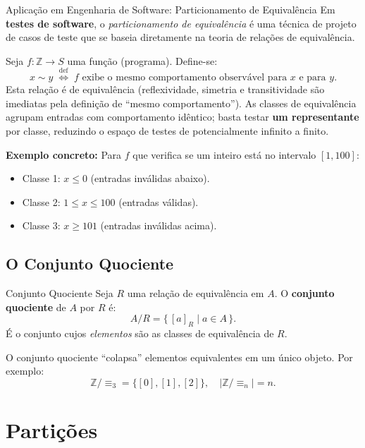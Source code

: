 \documentclass[12pt,a4paper]{book}
\begin{document}
\begin{exemplo}{Aplicação em Engenharia de Software: Particionamento de Equivalência}{}
Em \textbf{testes de software}, o \emph{particionamento de equivalência} é uma técnica de projeto de casos de teste que se baseia diretamente na teoria de relações de equivalência.

Seja $f: \mathbb{Z} \to S$ uma função (programa). Define-se:
\[
  x \sim y \;\stackrel{\text{def}}{\Longleftrightarrow}\; f \text{ exibe o mesmo comportamento observável para } x \text{ e para } y.
\]
Esta relação é de equivalência (reflexividade, simetria e transitividade são imediatas pela definição de ``mesmo comportamento''). As classes de equivalência agrupam entradas com comportamento idêntico; basta testar \textbf{um representante} por classe, reduzindo o espaço de testes de potencialmente infinito a finito.

\medskip
\textbf{Exemplo concreto:} Para $f$ que verifica se um inteiro está no intervalo $[1, 100]$:
\begin{itemize}
  \item Classe 1: $x \le 0$ (entradas inválidas abaixo).
  \item Classe 2: $1 \le x \le 100$ (entradas válidas).
  \item Classe 3: $x \ge 101$ (entradas inválidas acima).
\end{itemize}
\end{exemplo}

\section{O Conjunto Quociente}

\begin{definicao}{Conjunto Quociente}{}
Seja $R$ uma relação de equivalência em $A$. O \textbf{conjunto quociente} de $A$ por $R$ é:
\[
  A/R = \{\,[a]_R \mid a \in A\,\}.
\]
É o conjunto cujos \emph{elementos} são as classes de equivalência de $R$.
\end{definicao}

O conjunto quociente ``colapsa'' elementos equivalentes em um único objeto. Por exemplo:
\[
  \mathbb{Z}/{\equiv_3} = \{[0],[1],[2]\}, \quad |\mathbb{Z}/{\equiv_n}| = n.
\]

\chapter{Partições}
\end{document}
